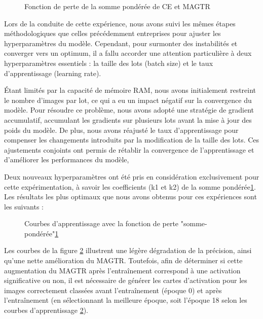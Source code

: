 \documentclass{report}
\begin{document}
{    \begin{figure}[htbp] 
	\centering
	\caption{Fonction de perte de la somme pondérée de CE et MAGTR}
	\label{fig:Fonction de perte de la somme pndérée de CE et MAGTR}
    \end{figure}


\hspace{1.6cm}Lors de la conduite de cette expérience, nous avons suivi les mêmes étapes méthodologiques que celles précédemment entreprises pour ajuster les hyperparamètres du modèle. Cependant, pour surmonter des instabilités et converger vers un optimum, il a fallu accorder une attention particulière à deux hyperparamètres essentiels : la taille des lots (batch size) et le taux d'apprentissage (learning rate). 
    \vspace*{0.5\baselineskip}

\hspace{1.6cm}Étant limités par la capacité de mémoire RAM, nous avons initialement restreint le nombre d'images par lot, ce qui a eu un impact négatif sur la convergence du modèle. Pour résoudre ce problème, nous avons adopté une stratégie de gradient accumulatif, accumulant les gradients sur plusieurs lots avant la mise à jour des poids du modèle. De plus, nous avons réajusté le taux d'apprentissage pour compenser les changements introduits par la modification de la taille des lots. Ces ajustements conjoints ont permis de rétablir la convergence de l'apprentissage et d'améliorer les performances du modèle, 
    \vspace*{0.5\baselineskip}

\hspace{1.6cm}Deux nouveaux hyperparamètres ont été pris en considération exclusivement pour cette expérimentation, à savoir les coefficients (k1 et k2) de la somme pondérée\ref{fig:Fonction de perte de la somme pndérée de CE et MAGTR}.
Les résultats les plus optimaux que nous avons obtenus pour ces expériences sont les suivants :

    \begin{figure}[htbp] 
	\centering
	\caption{Courbes d'apprentissage avec la fonction de perte "somme-pondérée"\ref{fig:Fonction de perte de la somme pndérée de CE et MAGTR}}
	\label{fig:Courbes d'apprentissage de l'expérience "somme-pondérée"}
    \end{figure}
\newpage
\hspace{1.6cm}Les courbes de la figure \ref{fig:Courbes d'apprentissage de l'expérience "somme-pondérée"} illustrent une légère dégradation de la précision, ainsi qu'une nette amélioration du MAGTR. Toutefois, afin de déterminer si cette augmentation du MAGTR après l'entraînement correspond à une activation significative ou non, il est nécessaire de générer les cartes d'activation pour les images correctement classées avant l'entraînement (époque 0) et après l'entraînement (en sélectionnant la meilleure époque, soit l'époque 18 selon les courbes d'apprentissage \ref{fig:Courbes d'apprentissage de l'expérience "somme-pondérée"}).

}
\end{document}
